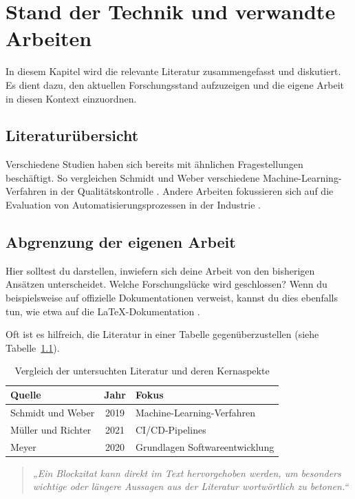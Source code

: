\chapter{Stand der Technik und verwandte Arbeiten}
\label{chap:related_work}

In diesem Kapitel wird die relevante Literatur zusammengefasst und diskutiert. Es dient dazu, den aktuellen Forschungsstand aufzuzeigen und die eigene Arbeit in diesen Kontext einzuordnen.

\section{Literaturübersicht}
Verschiedene Studien haben sich bereits mit ähnlichen Fragestellungen beschäftigt. So vergleichen Schmidt und Weber verschiedene Machine-Learning-Verfahren in der Qualitätskontrolle \cite{schmidt2019vergleich}. Andere Arbeiten fokussieren sich auf die Evaluation von Automatisierungsprozessen in der Industrie \cite{mueller2021evaluation}.

\section{Abgrenzung der eigenen Arbeit}
Hier solltest du darstellen, inwiefern sich deine Arbeit von den bisherigen Ansätzen unterscheidet. Welche Forschungslücke wird geschlossen? Wenn du beispielsweise auf offizielle Dokumentationen verweist, kannst du dies ebenfalls tun, wie etwa auf die \LaTeX-Dokumentation \cite{latexproject2023}. 

Oft ist es hilfreich, die Literatur in einer Tabelle gegenüberzustellen (siehe Tabelle~\ref{tab:lit_comparison}).

\begin{table}[htbp]
  \centering
  \caption{Vergleich der untersuchten Literatur und deren Kernaspekte}
  \label{tab:lit_comparison}
  \begin{tabular}{l c l}
    \hline
    \textbf{Quelle} & \textbf{Jahr} & \textbf{Fokus} \\
    \hline
    Schmidt und Weber \cite{schmidt2019vergleich} & 2019 & Machine-Learning-Verfahren \\
    Müller und Richter \cite{mueller2021evaluation} & 2021 & CI/CD-Pipelines \\
    Meyer \cite{meyer2020grundlagen} & 2020 & Grundlagen Softwareentwicklung \\
    \hline
  \end{tabular}
\end{table}

\begin{quote}
  \textit{„Ein Blockzitat kann direkt im Text hervorgehoben werden, um besonders wichtige oder längere Aussagen aus der Literatur wortwörtlich zu betonen.“}
\end{quote}